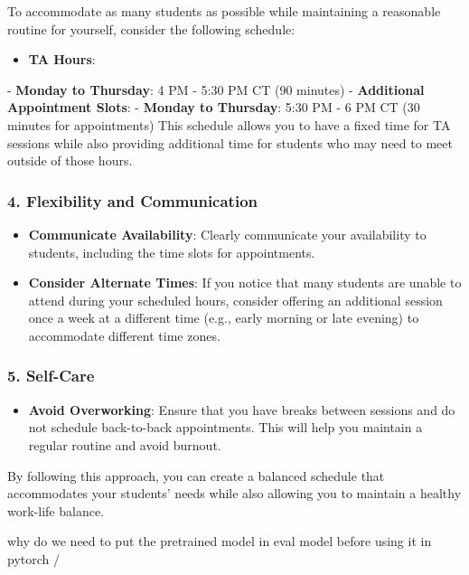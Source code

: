 \begin{botresponse}
To accommodate as many students as possible while maintaining a reasonable routine for yourself, consider the following schedule:

\begin{itemize}
\item \textbf{TA Hours}:
\end{itemize}

- \textbf{Monday to Thursday}: 4 PM - 5:30 PM CT (90 minutes)
- \textbf{Additional Appointment Slots}:
- \textbf{Monday to Thursday}: 5:30 PM - 6 PM CT (30 minutes for appointments)
This schedule allows you to have a fixed time for TA sessions while also providing additional time for students who may need to meet outside of those hours.

\subsubsection{4. \textbf{Flexibility and Communication}}

\begin{itemize}
\item \textbf{Communicate Availability}: Clearly communicate your availability to students, including the time slots for appointments.
\item \textbf{Consider Alternate Times}: If you notice that many students are unable to attend during your scheduled hours, consider offering an additional session once a week at a different time (e.g., early morning or late evening) to accommodate different time zones.
\end{itemize}

\subsubsection{5. \textbf{Self-Care}}

\begin{itemize}
\item \textbf{Avoid Overworking}: Ensure that you have breaks between sessions and do not schedule back-to-back appointments. This will help you maintain a regular routine and avoid burnout.
\end{itemize}

By following this approach, you can create a balanced schedule that accommodates your students' needs while also allowing you to maintain a healthy work-life balance.

\end{botresponse}

\begin{userprompt}

why do we need to put the pretrained model in eval model before using it in pytorch /

\end{userprompt}

